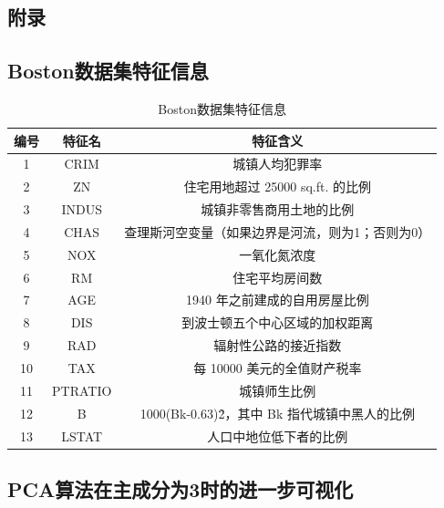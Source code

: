 \documentclass[12pt,a4paper]{article}
\theoremstyle{definition}
\begin{document}
\newpage
\begin{appendix}
	\section{附录}
	\subsection{Boston数据集特征信息}
	\label{apd:boston_char}
	\begin{table}[H]
		\renewcommand\arraystretch{1.35}
		\caption{Boston数据集特征信息}
		\label{tab:boston_char}
		\centering
		
		\begin{tabular}{c|c|c}
			\centering
			编号 & 特征名 & 特征含义 \\
			\hline
			1 & CRIM & 城镇人均犯罪率 \\
			2 & ZN & 住宅用地超过 25000 sq.ft. 的比例 \\
			3 & INDUS & 城镇非零售商用土地的比例 \\
			4 & CHAS & 查理斯河空变量（如果边界是河流，则为1；否则为0） \\
			5 & NOX & 一氧化氮浓度 \\
			6 & RM & 住宅平均房间数 \\
			7 & AGE & 1940 年之前建成的自用房屋比例 \\
			8 & DIS & 到波士顿五个中心区域的加权距离 \\
			9 & RAD & 辐射性公路的接近指数 \\
			10 & TAX & 每 10000 美元的全值财产税率 \\
			11 & PTRATIO & 城镇师生比例 \\
			12 & B & 1000(Bk-0.63)\^ 2，其中 Bk 指代城镇中黑人的比例 \\
			13 & LSTAT & 人口中地位低下者的比例 \\			
		\end{tabular}
	\end{table}
	
	\subsection{PCA算法在主成分为3时的进一步可视化}
	\label{apd:vis3}
	

\end{appendix}
\end{document}
